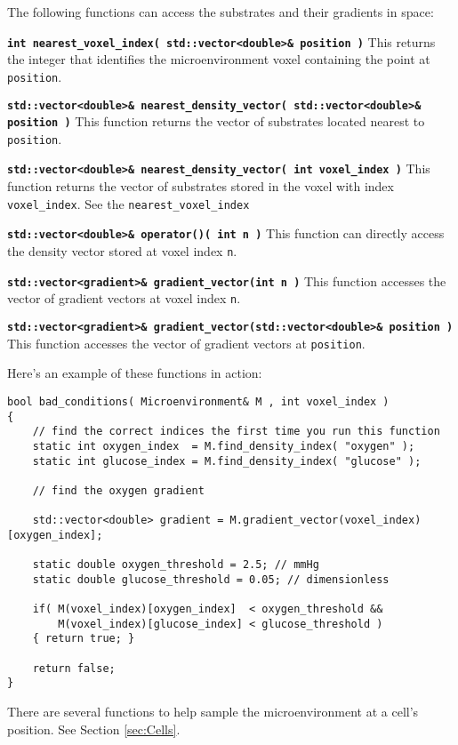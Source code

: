 \documentclass[12pt]{article}
\newcommand{\smallcode}[1]{\textbf{\texttt{#1}}}
\begin{document}
The following functions can access the substrates and their gradients in
space: 

\smallcode{int nearest\_voxel\_index( std::vector<double>\& position )} This 
returns the integer that identifies the microenvironment voxel containing the 
point at \verb+position+. 

\smallcode{std::vector<double>\& nearest\_density\_vector( std::vector<double>\& position )} 
This function returns the vector of substrates located nearest to \verb+position+. 

\smallcode{std::vector<double>\& nearest\_density\_vector( int voxel\_index )} 
This function returns the vector of substrates stored in the voxel with index 
\verb+voxel_index+. See the \verb+nearest_voxel_index+ 

\smallcode{std::vector<double>\& operator()( int n )} This function 
can directly access the density vector stored at voxel index \verb+n+. 

\smallcode{std::vector<gradient>\& gradient\_vector(int n )} This function 
accesses the vector of gradient vectors at voxel index \verb+n+. 
	
\smallcode{std::vector<gradient>\& gradient\_vector(std::vector<double>\& position )}
This function accesses the vector of gradient vectors at \verb+position+.

Here's an example of these functions in action:

\begin{verbatim}
bool bad_conditions( Microenvironment& M , int voxel_index )
{
    // find the correct indices the first time you run this function
    static int oxygen_index  = M.find_density_index( "oxygen" ); 
    static int glucose_index = M.find_density_index( "glucose" ); 

    // find the oxygen gradient 
    
    std::vector<double> gradient = M.gradient_vector(voxel_index)[oxygen_index]; 

    static double oxygen_threshold = 2.5; // mmHg 
    static double glucose_threshold = 0.05; // dimensionless 
 
    if( M(voxel_index)[oxygen_index]  < oxygen_threshold && 
        M(voxel_index)[glucose_index] < glucose_threshold )
    { return true; }
    
    return false; 
}
\end{verbatim}

There are several functions to help sample the microenvironment  
at a cell's position. See Section \ref{sec:Cells}.
\end{document}
